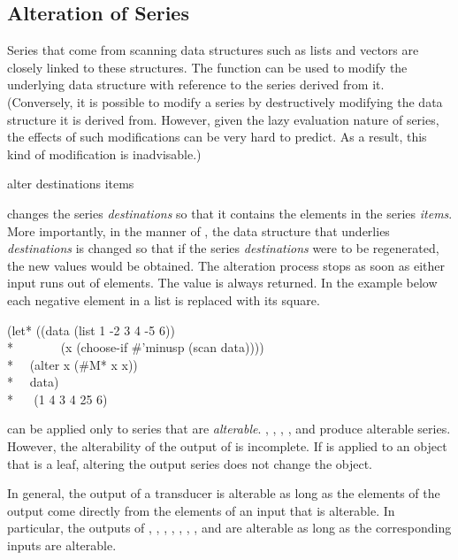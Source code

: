 \subsection{Alteration of Series}

Series that come from scanning data structures such as lists and vectors
are closely linked to these structures.  The function 
 can be used to modify the underlying data structure with
reference to the series derived from it. (Conversely, it is possible to
modify a series by destructively modifying the data structure it is derived
from.  However, given the lazy evaluation nature of series, the effects of
such modifications can be very hard to predict.  As a result, this kind of
modification is inadvisable.)

\begin{defun}[Function]
alter destinations items

 changes the series \emph{destinations} so that it contains
the elements in the series \emph{items}.  More importantly, in the
manner of , the data structure that underlies {\it
destinations} is changed so that if the series \emph{destinations} were
to be regenerated, the new values would be obtained.  The alteration
process stops as soon as either input runs out of elements.  The value
 is always returned. In the example below each negative element in
a list is replaced with its square.
\begin{lisp}
(let* ((data (list 1 -2 3 4 -5 6)) \\*
~~~~~~~(x (choose-if \#'minusp (scan data)))) \\*
~~(alter x (\#M* x x)) \\*
~~data) \\*
~~{\EV} (1 4 3 4 25 6)
\end{lisp}

 can be applied only to series that are \emph{alterable}.  
, , , , and
 produce alterable series.  
However, the alterability of
the output of
is incomplete.  If
is applied to an object that is a leaf,
altering the output series does not change the object.

In general, the output of a transducer is alterable as long as the elements
of the output come directly from the elements of an input that is
alterable.  In particular, the outputs of , ,
, , , , ,
and  are alterable as long as the corresponding inputs are
alterable.
\end{defun}


